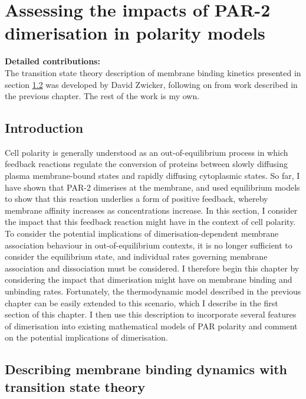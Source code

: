 \documentclass[12pt]{"report"}
\begin{document}
\clearpage
\chapter{Assessing the impacts of PAR-2 dimerisation in polarity models}

\textbf{Detailed contributions:}\\

The transition state theory description of membrane binding kinetics presented in section \ref{section:transition_state_theory} was developed by David Zwicker, following on from work described in the previous chapter. The rest of the work is my own.\\


\clearpage
\section{Introduction}

Cell polarity is generally understood as an out-of-equilibrium process in which feedback reactions regulate the conversion of proteins between slowly diffusing plasma membrane-bound states and rapidly diffusing cytoplasmic states. So far, I have shown that PAR-2 dimerises at the membrane, and used equilibrium models to show that this reaction underlies a form of positive feedback, whereby membrane affinity increases as concentrations increase. In this section, I consider the impact that this feedback reaction might have in the context of cell polarity. \\

To consider the potential implications of dimerisation-dependent membrane association behaviour in out-of-equilibrium contexts, it is no longer sufficient to consider the equilibrium state, and individual rates governing membrane association and dissociation must be considered. I therefore begin this chapter by considering the impact that dimerisation might have on membrane binding and unbinding rates. Fortunately, the thermodynamic model described in the previous chapter can be easily extended to this scenario, which I describe in the first section of this chapter. I then use this description to incorporate several features of dimerisation into existing mathematical models of PAR polarity and comment on the potential implications of dimerisation.\\


\clearpage
\section{Describing membrane binding dynamics with transition state theory}
\label{section:transition_state_theory}
\end{document}
